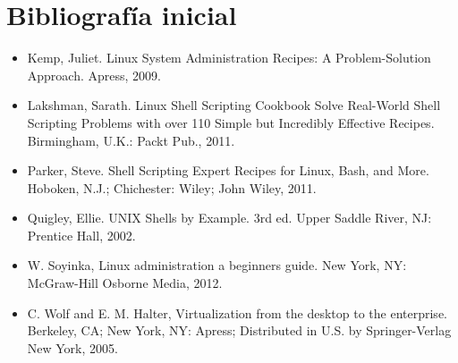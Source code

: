\section {Bibliografía inicial}
\begin{itemize}
\item Kemp, Juliet. Linux System Administration Recipes: A Problem-Solution Approach. Apress, 2009. 
\item Lakshman, Sarath. Linux Shell Scripting Cookbook Solve Real-World Shell Scripting Problems with over 110 Simple but Incredibly Effective Recipes. Birmingham, U.K.: Packt Pub., 2011. 
\item Parker, Steve. Shell Scripting Expert Recipes for Linux, Bash, and More. Hoboken, N.J.; Chichester: Wiley; John Wiley, 2011.
\item Quigley, Ellie. UNIX Shells by Example. 3rd ed. Upper Saddle River, NJ: Prentice Hall, 2002.
\item W. Soyinka, Linux administration a beginners guide. New York, NY: McGraw-Hill Osborne Media, 2012.
\item C. Wolf and E. M. Halter, Virtualization from the desktop to the enterprise. Berkeley, CA; New York, NY: Apress; Distributed in U.S. by Springer-Verlag New York, 2005.



\end{itemize}


